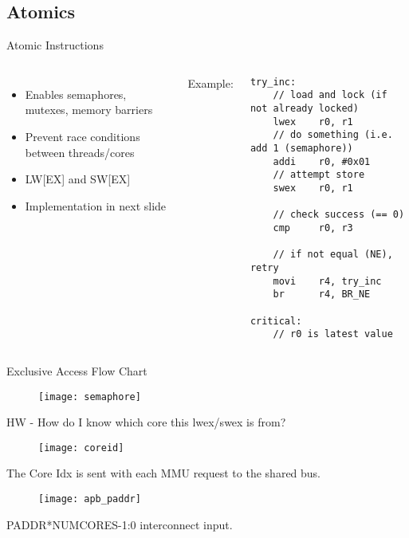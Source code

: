 \documentclass[aspectratio=169]{beamer}
\begin{document}
\subsection{Atomics}
\begin{frame}[fragile]{Atomic Instructions}
\begin{columns}[t]
\begin{itemize}\setlength{\itemsep 1em}
    \item Enables semaphores, mutexes, memory barriers
    \item Prevent race conditions between threads/cores
    \item LW[EX] and SW[EX]
    \item Implementation in next slide
\end{itemize}
Example:
\begin{lstlisting}[basicstyle=\tiny\ttfamily]
try_inc:
    // load and lock (if not already locked)
    lwex    r0, r1
    // do something (i.e. add 1 (semaphore))
    addi    r0, #0x01
    // attempt store
    swex    r0, r1
    
    // check success (== 0)
    cmp     r0, r3
    
    // if not equal (NE), retry
    movi    r4, try_inc
    br      r4, BR_NE
    
critical:
    // r0 is latest value
\end{lstlisting}
\end{columns}
\end{frame}

\begin{frame}{Exclusive Access Flow Chart}
    \begin{figure}
        \centering
        \texttt{[image: semaphore]}
    \end{figure}
\end{frame}

\begin{frame}{HW - How do I know which core this lwex/swex is from?}
    \begin{figure}
        \centering
        \texttt{[image: coreid]}
    \end{figure}
    The Core Idx is sent with each MMU request to the shared bus.\\
    \begin{figure}
        \centering
        \texttt{[image: apb\_paddr]}
    \end{figure}
    PADDR*NUMCORES-1:0 interconnect input.
\end{frame}
\end{document}
